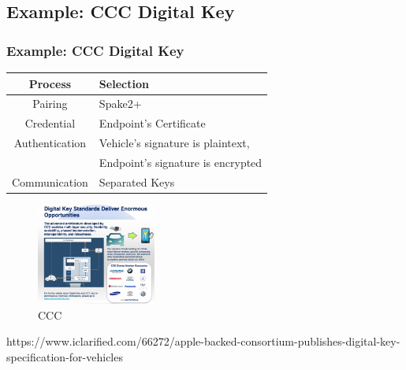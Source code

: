 \documentclass{ctexbeamer}
\begin{document}
\subsection{Example: CCC Digital Key}
\begin{frame}
    \frametitle{Example: CCC Digital Key}


    \begin{table}[width=0.9\textwidth]
        \begin{tabular}{ |c|l| } \hline
            \textbf{Process} & \textbf{Selection} \\ \hline
            Pairing & Spake2+  \\ \hline
            Credential & Endpoint's Certificate \\ \hline
            Authentication &  Vehicle's signature is plaintext,  \\
            ~ & Endpoint's signature is encrypted \\ \hline
            Communication & Separated Keys \\ \hline
            \end{tabular}
            \end{table}

    \begin{figure}[H]
        \centering 
        \includegraphics[width=0.35\textwidth]{pic/ccc.jpg} 
        \caption{CCC} 
        \label{fig.ccc}
    \end{figure}

    https://www.iclarified.com/66272/apple-backed-consortium-publishes-digital-key-specification-for-vehicles

\end{frame}
\end{document}
